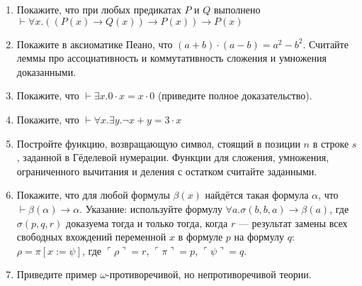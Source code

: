 \documentclass[11pt,a4paper,oneside]{scrartcl}
\begin{document}
\begin{enumerate}
\item Покажите, что при любых предикатах $P$ и $Q$ выполнено
$\vdash \forall x.((P(x)\rightarrow Q(x))\rightarrow P(x))\rightarrow P(x)$ 
\item Покажите в аксиоматике Пеано, что $(a+b)\cdot (a-b) = a^2 - b^2$. Считайте леммы про ассоциативность и коммутативность
сложения и умножения доказанными.
\item Покажите, что $\vdash \exists x.0\cdot x=x \cdot 0$ (приведите полное доказательство).
\item Покажите, что $\vdash \forall x.\exists y.\neg x + y = 3 \cdot x$ 
\item Постройте функцию, возвращающую символ, стоящий в позиции $n$ в строке $s$, заданной в Гёделевой нумерации.
Функции для сложения, умножения, ограниченного вычитания и деления с остатком считайте заданными.
\item Покажите, что для любой формулы $\beta(x)$ найдётся такая формула $\alpha$, 
что $\vdash\beta(\alpha)\rightarrow\alpha$. Указание: используйте формулу $\forall a.\sigma(b,b,a)\rightarrow\beta(a)$,
где $\sigma(p,q,r)$ доказуема тогда и только тогда, когда $r$ --- результат замены всех свободных
вхождений переменной $x$ в формуле $p$ на формулу $q$: $\rho = \pi[x := \psi]$, где
$\ulcorner\rho\urcorner = r$, $\ulcorner\pi\urcorner = p$, $\ulcorner\psi\urcorner = q$.
\item Приведите пример $\omega$-противоречивой, но непротиворечивой теории.
\end{enumerate}
\end{document}
